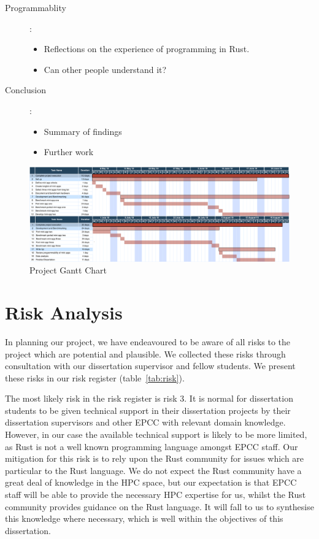 \documentclass{report}[a4]
\begin{document}
\begin{description}
  \item[Programmablity]:
  \begin{itemize}
    \item Reflections on the experience of programming in Rust.
    \item Can other people understand it?
  \end{itemize}
  \item[Conclusion] :
  \begin{itemize}
    \item Summary of findings
    \item Further work
  \end{itemize}
\end{description}

\begin{figure}
  \centering
  \includegraphics[angle=90, scale=0.6]{figures/dis_gantt.pdf}
  \caption{Project Gantt Chart}
  \label{}
\end{figure}

\chapter{Risk Analysis}
In planning our project, we have endeavoured to be aware of all risks to the project which are potential and plausible. We collected these risks through consultation with our dissertation supervisor and fellow students. We present these risks in our risk register (table~\ref{tab:risk}).

The most likely risk in the risk register is risk 3. It is normal for dissertation students to be given technical support in their dissertation projects by their dissertation supervisors and other EPCC with relevant domain knowledge. However, in our case the available technical support is likely to be more limited, as Rust is not a well known programming language amongst EPCC staff. Our mitigation for this risk is to rely upon the Rust community for issues which are particular to the Rust language. We do not expect the Rust community have a great deal of knowledge in the HPC space, but our expectation is that EPCC staff will be able to provide the necessary HPC expertise for us, whilst the Rust community provides guidance on the Rust language. It will fall to us to synthesise this knowledge where necessary, which is well within the objectives of this dissertation.
\end{document}
